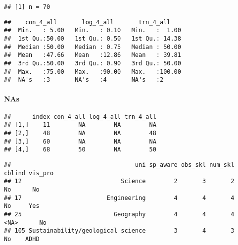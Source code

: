 \documentclass[
]{article}
\begin{document}
\begin{verbatim}
## [1] n = 70
\end{verbatim}

\begin{verbatim}
##    con_4_all       log_4_all       trn_4_all     
##  Min.   : 5.00   Min.   : 0.10   Min.   :  1.00  
##  1st Qu.:50.00   1st Qu.: 0.50   1st Qu.: 14.38  
##  Median :50.00   Median : 0.75   Median : 50.00  
##  Mean   :47.66   Mean   :12.86   Mean   : 39.81  
##  3rd Qu.:50.00   3rd Qu.: 0.90   3rd Qu.: 50.00  
##  Max.   :75.00   Max.   :90.00   Max.   :100.00  
##  NA's   :3       NA's   :4       NA's   :2
\end{verbatim}

\hypertarget{nas-1}{%
\paragraph{NAs}\label{nas-1}}

\begin{verbatim}
##      index con_4_all log_4_all trn_4_all
## [1,]    11        NA        NA        NA
## [2,]    48        NA        NA        48
## [3,]    60        NA        NA        NA
## [4,]    68        50        NA        50
\end{verbatim}

\begin{verbatim}
##                                   uni sp_aware obs_skl num_skl cblind vis_pro
## 12                            Science        2       3       2     No      No
## 17                        Engineering        4       4       4     No     Yes
## 25                          Geography        4       4       4   <NA>      No
## 105 Sustainability/geological science        3       4       3     No    ADHD
\end{verbatim}
\end{document}
